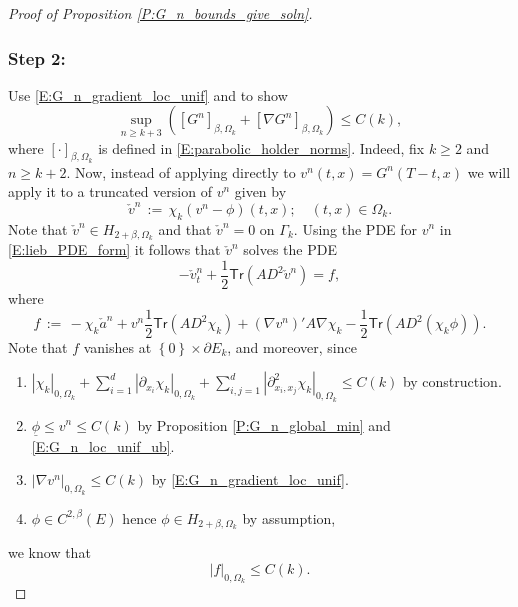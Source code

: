 \documentclass[11pt, letterpaper]{amsart}
\theoremstyle{definition}
\theoremstyle{remark}
\numberwithin{equation}{section}
\newcommand{\dfn}{\, := \,}
\newcommand{\cbra}[1]{\left\{#1\right\}}
\newcommand{\ul}[1]{\underline{#1}}
\newcommand{\tr}{\mathsf{Tr}}
\begin{document}
\begin{proof}[Proof of Proposition \ref{P:G_n_bounds_give_soln}]
\subsubsection*{Step 2:} Use \eqref{E:G_n_gradient_loc_unif}  and \cite[Theorem 4, Ch 7, Section 2]{MR0181836} to show
\begin{equation}\label{E:G_n_holder_gradient_loc_unif}
\sup_{n\geq k+3}\left(\left[G^n\right]_{\beta,\Omega_k} + \left[\nabla G^n\right]_{\beta,\Omega_k}\right) \leq C(k),
\end{equation}
where $[\cdot]_{\beta,\Omega_k}$ is defined in \eqref{E:parabolic_holder_norms}. Indeed, fix $k\geq 2$ and $n\geq k+2$.  Now, instead of applying \cite[Theorem 4, Ch 7, Section 2]{MR0181836} directly to $v^n(t,x) = G^n(T-t,x)$ we will apply it to a truncated version of $v^n$ given by
\begin{equation}\label{E:truncated_v_n}
\check{v}^n\dfn \chi_k\left(v^n - \phi\right)(t,x);\quad (t,x)\in\Omega_k.
\end{equation}
Note that $\check{v}^n\in H_{2+\beta,\Omega_k}$ and that $\check{v}^n = 0$ on $\Gamma_k$. Using the PDE for $v^n$ in \eqref{E:lieb_PDE_form} it follows that $\check{v}^n$ solves the PDE
\begin{equation}\label{E:check_v_n_pde}
-\check{v}^n_t + \frac{1}{2}\tr\left(AD^2\check{v}^n\right) = f,
\end{equation}
where
\begin{equation}\label{E:holder_f_def}
f \dfn -\chi_k \check{a}^n + v^n\frac{1}{2}\tr\left(AD^2\chi_k\right) + (\nabla v^n)'A\nabla\chi_k - \frac{1}{2}\tr\left(AD^2(\chi_k\phi)\right).
\end{equation}
Note that $f$ vanishes at $\cbra{0}\times\partial E_k$, and moreover, since
\begin{enumerate}[(1)]
\item $|\chi_k|_{0,\Omega_k} + \sum_{i=1}^d |\partial_{x_i}\chi_k|_{0,\Omega_k} + \sum_{i,j=1}^d |\partial^2_{x_i,x_j}\chi_k|_{0,\Omega_k} \leq C(k)$ by construction.
\item $\ul{\phi} \leq v^n \leq C(k)$ by Proposition \ref{P:G_n_global_min} and \eqref{E:G_n_loc_unif_ub}.
\item $|\nabla v^n|_{0,\Omega_k} \leq C(k)$ by \eqref{E:G_n_gradient_loc_unif}.
\item $\phi\in C^{2,\beta}(E)$ hence $\phi\in H_{2+\beta,\Omega_k}$ by assumption,
\end{enumerate}
we know that
\begin{equation}\label{E:f_unif_bound}
|f|_{0,\Omega_k} \leq C(k).

\end{equation}
\end{proof}
\end{document}
